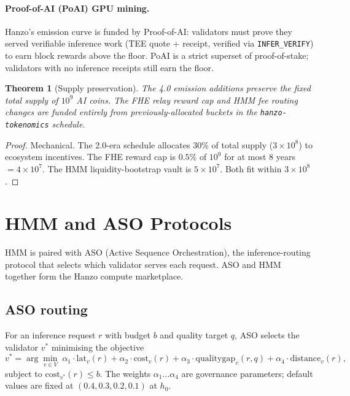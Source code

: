\documentclass[11pt,letterpaper]{article}
\newtheorem{theorem}{Theorem}[section]
\begin{document}
\paragraph{Proof-of-AI (PoAI) GPU mining.} Hanzo's emission curve is
funded by Proof-of-AI: validators must prove they served verifiable
inference work (TEE quote + receipt, verified via
\texttt{INFER\_VERIFY}) to earn block rewards above the floor.
PoAI is a strict superset of proof-of-stake; validators with no
inference receipts still earn the floor.

\begin{theorem}[Supply preservation]
The 4.0 emission additions preserve the fixed total supply of $10^9$
AI coins. The FHE relay reward cap and HMM fee routing changes are
funded entirely from previously-allocated buckets in the
\texttt{hanzo-tokenomics} schedule.
\end{theorem}
\begin{proof}
Mechanical. The 2.0-era schedule allocates $30\%$ of total supply
($3 \times 10^8$) to ecosystem incentives. The FHE reward cap is
$0.5\%$ of $10^9$ for at most 8 years $= 4 \times 10^7$. The HMM
liquidity-bootstrap vault is $5 \times 10^7$. Both fit within
$3 \times 10^8$.
\end{proof}

\section{HMM and ASO Protocols}
\label{sec:hmm-aso}

HMM is paired with ASO (Active Sequence Orchestration), the
inference-routing protocol that selects which validator serves each
request. ASO and HMM together form the Hanzo compute marketplace.

\subsection{ASO routing}

For an inference request $r$ with budget $b$ and quality target $q$,
ASO selects the validator $v^*$ minimising the objective
\begin{equation}
v^* = \arg\min_{v \in V} \;
\alpha_1 \cdot \mathrm{lat}_v(r)
+ \alpha_2 \cdot \mathrm{cost}_v(r)
+ \alpha_3 \cdot \mathrm{qualitygap}_v(r, q)
+ \alpha_4 \cdot \mathrm{distance}_v(r),
\label{eq:aso-route}
\end{equation}
subject to $\mathrm{cost}_{v^*}(r) \le b$. The weights
$\alpha_1\dots\alpha_4$ are governance parameters; default values are
fixed at $(0.4, 0.3, 0.2, 0.1)$ at $h_0$.
\end{document}
